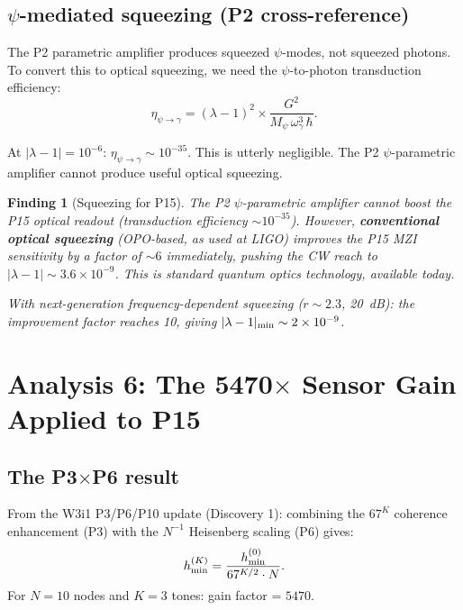 \documentclass[11pt]{article}
\newtheorem{finding}{Finding}
\newcommand{\ee}[1]{\times 10^{#1}}
\newcommand{\Mpsi}{M_\psi}
\newcommand{\lam}{\lambda}
\begin{document}
\subsection{$\psi$-mediated squeezing (P2 cross-reference)}

The P2 parametric amplifier produces squeezed $\psi$-modes, not
squeezed photons. To convert this to optical squeezing, we need
the $\psi$-to-photon transduction efficiency:
\begin{equation}
\eta_{\psi\to\gamma} = (\lam-1)^2 \times \frac{G^2}{\Mpsi\,\omega_\gamma^3\,\hbar}.
\end{equation}

At $|\lam-1| = 10^{-6}$:
$\eta_{\psi\to\gamma} \sim 10^{-35}$. This is utterly negligible.
The P2 $\psi$-parametric amplifier cannot produce useful optical
squeezing.

\begin{finding}[Squeezing for P15]
\label{find:squeezing}
The P2 $\psi$-parametric amplifier cannot boost the P15 optical
readout (transduction efficiency $\sim 10^{-35}$). However,
\textbf{conventional optical squeezing} (OPO-based, as used at
LIGO) improves the P15 MZI sensitivity by a factor of $\sim 6$
immediately, pushing the CW reach to $|\lam-1| \sim 3.6\ee{-9}$.
This is standard quantum optics technology, available today.

With next-generation frequency-dependent squeezing ($r \sim 2.3$,
20~dB): the improvement factor reaches 10, giving
$|\lam-1|_{\rm min} \sim 2\ee{-9}$.
\end{finding}

\section{Analysis 6: The 5470$\times$ Sensor Gain Applied to P15}
\label{sec:5470x}

\subsection{The P3$\times$P6 result}

From the W3i1 P3/P6/P10 update (Discovery 1): combining the
$67^K$ coherence enhancement (P3) with the $N^{-1}$ Heisenberg
scaling (P6) gives:
\begin{equation}
h_{\rm min}^{(K)} = \frac{h_{\rm min}^{(0)}}{67^{K/2} \cdot N}.
\end{equation}
For $N = 10$ nodes and $K = 3$ tones: gain factor = $5470$.
\end{document}
